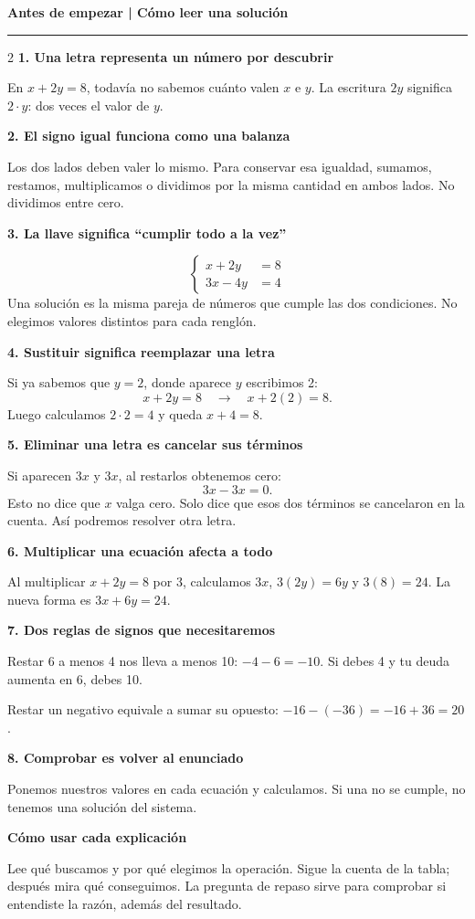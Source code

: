 \documentclass[11pt,a4paper,landscape]{article}
\newcommand{\titulo}[1]{{\LARGE\bfseries #1}\par\smallskip\hrule\medskip}
\begin{document}
\newpage
\titulo{Antes de empezar | Cómo leer una solución}
\begin{multicols}{2}
\textbf{1. Una letra representa un número por descubrir}\par
En \(x+2y=8\), todavía no sabemos cuánto valen \(x\) e \(y\). La escritura \(2y\) significa \(2\cdot y\): dos veces el valor de \(y\).\par
\textbf{2. El signo igual funciona como una balanza}\par
Los dos lados deben valer lo mismo. Para conservar esa igualdad, sumamos, restamos, multiplicamos o dividimos por la misma cantidad en ambos lados. No dividimos entre cero.\par
\textbf{3. La llave significa ``cumplir todo a la vez''}\par
\[\left\{\begin{aligned}x+2y&=8\\3x-4y&=4\end{aligned}\right.\]
Una solución es la misma pareja de números que cumple las dos condiciones. No elegimos valores distintos para cada renglón.\par
\textbf{4. Sustituir significa reemplazar una letra}\par
Si ya sabemos que \(y=2\), donde aparece \(y\) escribimos 2:\[x+2y=8\quad\longrightarrow\quad x+2(2)=8.\]
Luego calculamos \(2\cdot2=4\) y queda \(x+4=8\).\par
\columnbreak
\textbf{5. Eliminar una letra es cancelar sus términos}\par
Si aparecen \(3x\) y \(3x\), al restarlos obtenemos cero:\[3x-3x=0.\]
Esto no dice que \(x\) valga cero. Solo dice que esos dos términos se cancelaron en la cuenta. Así podremos resolver otra letra.\par
\textbf{6. Multiplicar una ecuación afecta a todo}\par
Al multiplicar \(x+2y=8\) por 3, calculamos \(3x\), \(3(2y)=6y\) y \(3(8)=24\). La nueva forma es \(3x+6y=24\).\par
\textbf{7. Dos reglas de signos que necesitaremos}\par
Restar 6 a menos 4 nos lleva a menos 10: \(-4-6=-10\). Si debes 4 y tu deuda aumenta en 6, debes 10.\par
Restar un negativo equivale a sumar su opuesto: \(-16-(-36)=-16+36=20\).\par
\textbf{8. Comprobar es volver al enunciado}\par
Ponemos nuestros valores en cada ecuación y calculamos. Si una no se cumple, no tenemos una solución del sistema.\par
\textbf{Cómo usar cada explicación}\par
Lee qué buscamos y por qué elegimos la operación. Sigue la cuenta de la tabla; después mira qué conseguimos. La pregunta de repaso sirve para comprobar si entendiste la razón, además del resultado.
\end{multicols}
\end{document}
